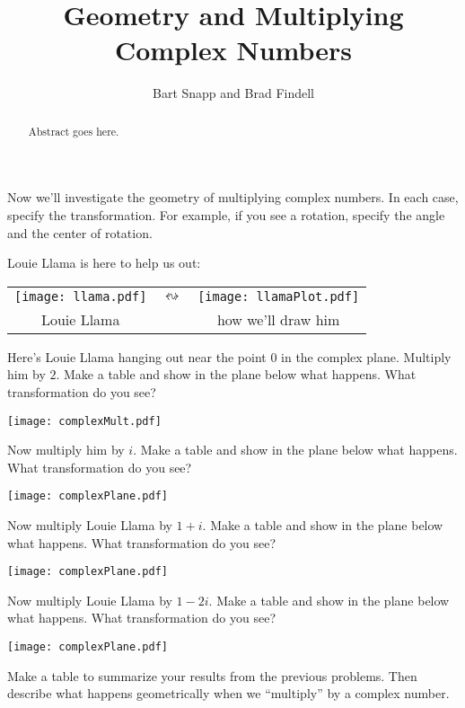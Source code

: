 \documentclass{ximera}
\title{Geometry and Multiplying Complex Numbers}
\author{Bart Snapp and Brad Findell}
\begin{document}
\begin{abstract}
Abstract goes here.  
\end{abstract}
\maketitle

\label{A:complexMultiplication}

Now we'll investigate the geometry of multiplying complex
numbers. In each case, specify the transformation.  For example, if you see a rotation, specify the angle and the center of rotation.  

Louie Llama is here to help us out:
\begin{image}
\begin{tabular}{ccc}
\texttt{[image: llama.pdf]} & 
\qquad $\leftrightsquigarrow$\qquad & 
\texttt{[image: llamaPlot.pdf]}\\
Louie Llama & & how we'll draw him
\end{tabular}
\end{image}

\begin{problem} 
Here's Louie Llama hanging out near the point $0$ in the complex
plane. Multiply him by $2$. Make a table and show in the plane below what happens.  What transformation do you see?  
\begin{image}
\texttt{[image: complexMult.pdf]}
\end{image}
\end{problem}

\begin{problem} 
Now multiply him by $i$. Make a table and show in the plane below what happens.  What transformation do you see?  
\begin{image}
\texttt{[image: complexPlane.pdf]}
\end{image}
\end{problem}

\vfill

\begin{problem} 
Now multiply Louie Llama by $1+i$. Make a table and show in the plane
below what happens.  What transformation do you see?  
\begin{image}
\texttt{[image: complexPlane.pdf]}
\end{image}
\end{problem}

\vfill


\begin{problem} 
Now multiply Louie Llama by $1 - 2i$. Make a
table and show in the plane below what happens.  What transformation do you see?  
\begin{image}
\texttt{[image: complexPlane.pdf]}
\end{image}
\end{problem}


\begin{problem}
Make a table to summarize your results from the previous problems.  
Then describe what happens geometrically when we ``multiply''  by a complex
number. 
\end{problem}
\end{document}

